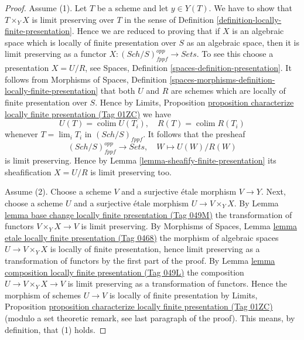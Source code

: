 \documentclass{amsart}
\theoremstyle{plain}
\theoremstyle{definition}
\theoremstyle{remark}
\numberwithin{equation}{subsection}
\def\lim{\mathop{\mathrm{lim}}\nolimits}
\def\colim{\mathop{\mathrm{colim}}\nolimits}
\def\Sch{\mathit{Sch}}
\begin{document}
\begin{proof}
Assume (1). Let $T$ be a scheme and let $y \in Y(T)$. We have to show that
$T \times_Y X$ is limit preserving over $T$ in the sense of
Definition \ref{definition-locally-finite-presentation}.
Hence we are reduced to proving that if $X$ is an algebraic space which
is locally of finite presentation over $S$ as an algebraic space, then it
is limit preserving as a functor
$X : (\Sch/S)_{fppf}^{opp} \to \textit{Sets}$.
To see this choose a presentation $X = U/R$, see
Spaces, Definition \ref{spaces-definition-presentation}.
It follows from
Morphisms of Spaces,
Definition \ref{spaces-morphisms-definition-locally-finite-presentation}
that both $U$ and $R$ are schemes which are locally of finite presentation
over $S$. Hence by
Limits, Proposition
\href{https://stacks.math.columbia.edu/tag/01ZC}{proposition characterize locally finite presentation (Tag 01ZC)}
we have
$$
U(T) = \colim U(T_i), \quad
R(T) = \colim R(T_i)
$$
whenever $T = \lim_i T_i$ in $(\Sch/S)_{fppf}$. It follows
that the presheaf
$$
(\Sch/S)_{fppf}^{opp} \longrightarrow \textit{Sets}, \quad
W \longmapsto U(W)/R(W)
$$
is limit preserving. Hence by
Lemma \ref{lemma-sheafify-finite-presentation}
its sheafification $X = U/R$ is limit preserving too.

\medskip\noindent
Assume (2). Choose a scheme $V$ and a surjective \'etale morphism
$V \to Y$. Next, choose a scheme $U$ and a surjective \'etale morphism
$U \to V \times_Y X$. By
Lemma \href{https://stacks.math.columbia.edu/tag/049M}{lemma base change locally finite presentation (Tag 049M)}
the transformation of functors $V \times_Y X \to V$ is limit preserving. By
Morphisms of Spaces,
Lemma \href{https://stacks.math.columbia.edu/tag/0468}{lemma etale locally finite presentation (Tag 0468)}
the morphism of algebraic spaces $U \to V \times_Y X$ is locally
of finite presentation, hence limit preserving as
a transformation of functors by the first part of the proof. By
Lemma \href{https://stacks.math.columbia.edu/tag/049L}{lemma composition locally finite presentation (Tag 049L)}
the composition $U \to V \times_Y X \to V$ is limit preserving
as a transformation of functors. Hence
the morphism of schemes $U \to V$ is locally of finite presentation by
Limits, Proposition
\href{https://stacks.math.columbia.edu/tag/01ZC}{proposition characterize locally finite presentation (Tag 01ZC)}
(modulo a set theoretic remark, see last paragraph of the proof).
This means, by definition, that (1) holds.


\end{proof}
\end{document}

